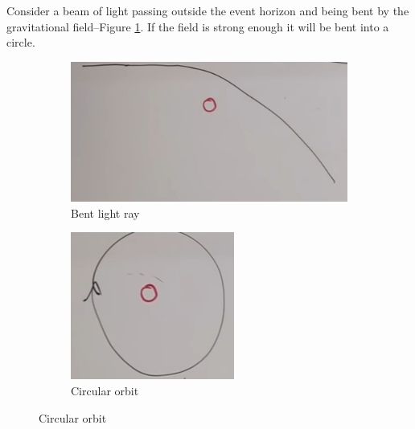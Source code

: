 \documentclass[]{article}
\begin{document}
{Consider a beam of light passing outside the event horizon and being bent by the gravitational field--Figure \ref{fig:gr-6-bent-light-ray}. If the field is strong enough it will be bent into a circle.
\begin{figure}[H]
	\caption{Light ray being bent my massive object}
	\begin{subfigure}[t]{0.45\textwidth}
		\caption{Bent light ray}\label{fig:gr-6-bent-light-ray}
		\includegraphics[width=\textwidth]{gr-6-bent-light-ray}
	\end{subfigure}
	\begin{subfigure}[t]{0.45\textwidth}
		\caption{Circular orbit}\label{fig:gr-6-circular-trajectory}
		\includegraphics[width=\textwidth]{gr-6-circular-trajectory}
	\end{subfigure}
\end{figure}


}
\end{document}
